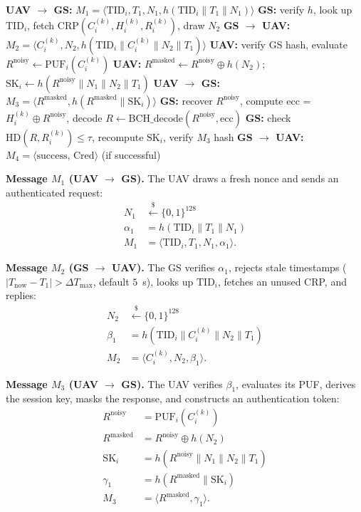 \documentclass[journal,a4paper,10pt]{IEEEtran}
\begin{document}
\begin{algorithm}[t]
\caption{Phase 2 UAV--GS Mutual Authentication}
\label{alg:phase2}
\begin{algorithmic}[1]
\STATE \textbf{UAV $\to$ GS:} $M_1 = \langle
  \mathrm{TID}_i, T_1, N_1, h(\mathrm{TID}_i\|T_1\|N_1) \rangle$
\STATE \textbf{GS:} verify $h$, look up $\mathrm{TID}_i$, fetch
  CRP$(C_i^{(k)}, H_i^{(k)}, R_i^{(k)})$, draw $N_2$
\STATE \textbf{GS $\to$ UAV:} $M_2 = \langle
  C_i^{(k)}, N_2, h(\mathrm{TID}_i\|C_i^{(k)}\|N_2\|T_1) \rangle$
\STATE \textbf{UAV:} verify GS hash, evaluate
  $R^{\mathrm{noisy}}{\leftarrow}\mathrm{PUF}_i(C_i^{(k)})$
\STATE \textbf{UAV:} $R^{\mathrm{masked}}{\leftarrow}
  R^{\mathrm{noisy}}\oplus h(N_2)$;
  $\mathrm{SK}_i{\leftarrow} h(R^{\mathrm{noisy}}\|N_1\|N_2\|T_1)$
\STATE \textbf{UAV $\to$ GS:} $M_3 = \langle
  R^{\mathrm{masked}}, h(R^{\mathrm{masked}}\|\mathrm{SK}_i) \rangle$
\STATE \textbf{GS:} recover $R^{\mathrm{noisy}}$, compute ecc =
  $H_i^{(k)} \oplus R^{\mathrm{noisy}}$,
  decode $R{\leftarrow}\mathrm{BCH\_decode}(R^{\mathrm{noisy}},\mathrm{ecc})$
\STATE \textbf{GS:} check $\mathrm{HD}(R,R_i^{(k)}){\le}\tau$,
  recompute $\mathrm{SK}_i$, verify $M_3$ hash
\STATE \textbf{GS $\to$ UAV:} $M_4 = \langle
  \mathrm{success},\,\mathrm{Cred} \rangle$ (if successful)
\end{algorithmic}
\end{algorithm}

\textbf{Message $M_1$ (UAV $\to$ GS).} The UAV draws a fresh nonce and
sends an authenticated request:
\begin{align}
N_1 &\xleftarrow{\$} \{0,1\}^{128} \\
\alpha_1 &= h(\mathrm{TID}_i \| T_1 \| N_1) \\
M_1 &= \langle \mathrm{TID}_i, T_1, N_1, \alpha_1 \rangle.
\end{align}

\textbf{Message $M_2$ (GS $\to$ UAV).} The GS verifies $\alpha_1$,
rejects stale timestamps ($|T_{\mathrm{now}}{-}T_1|{>}\Delta T_{\max}$,
default $5$~s), looks up $\mathrm{TID}_i$, fetches an unused CRP, and
replies:
\begin{align}
N_2 &\xleftarrow{\$} \{0,1\}^{128} \\
\beta_1 &= h(\mathrm{TID}_i \| C_i^{(k)} \| N_2 \| T_1) \\
M_2 &= \langle C_i^{(k)}, N_2, \beta_1 \rangle.
\end{align}

\textbf{Message $M_3$ (UAV $\to$ GS).} The UAV verifies $\beta_1$,
evaluates its PUF, derives the session key, masks the response, and
constructs an authentication token:
\begin{align}
R^{\mathrm{noisy}} &= \mathrm{PUF}_i(C_i^{(k)}) \\
R^{\mathrm{masked}} &= R^{\mathrm{noisy}} \oplus h(N_2) \\
\mathrm{SK}_i &= h(R^{\mathrm{noisy}} \| N_1 \| N_2 \| T_1) \\
\gamma_1 &= h(R^{\mathrm{masked}} \| \mathrm{SK}_i) \\
M_3 &= \langle R^{\mathrm{masked}}, \gamma_1 \rangle.
\end{align}
\end{document}
